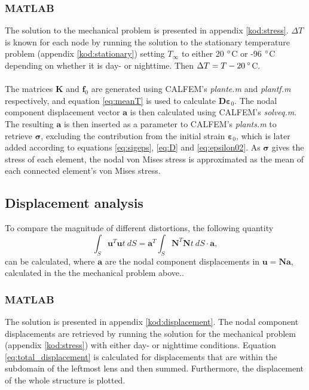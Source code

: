 \documentclass[a4paper,11pt]{article}
\begin{document}
\subsubsection{MATLAB}
The solution to the mechanical problem is presented in appendix \ref{kod:stress}. $\Delta T$ is known for each node by running the solution to the stationary temperature problem (appendix \ref{kod:stationary}) setting $T_{\infty}$ to either 20 $\degree$C or -96 $\degree$C depending on whether it is day- or nighttime. Then $\Delta T = T - 20 \: \degree$C.\\
\\The matrices $\boldsymbol K$ and $\boldsymbol{f}_0$ are generated using CALFEM's \textit{plante.m} and \textit{plantf.m} respectively, and equation \ref{eq:meanT} is used to calculate $\boldsymbol{D \varepsilon}_0$. The nodal component displacement vector $\boldsymbol{a}$ is then calculated using CALFEM's \textit{solveq.m}. The resulting $\boldsymbol{a}$ is then inserted as a parameter to CALFEM's \textit{plants.m} to retrieve $\boldsymbol{\sigma}$, excluding the contribution from the initial strain $\boldsymbol{\varepsilon}_0$, which is later added according to equations \ref{eq:sigeps}, \ref{eq:D} and \ref{eq:epsilon02}. As $\boldsymbol \sigma$ gives the stress of each element, the nodal von Mises stress is approximated as the mean of each connected element's von Mises stress.\\

\subsection{Displacement analysis}
To compare the magnitude of different distortions, the following quantity
\begin{equation}
    \int_S \boldsymbol u^T \boldsymbol u t \: dS = \boldsymbol a^T \int_S \boldsymbol N^T\boldsymbol N t \: dS \cdot \boldsymbol a,
    \label{eq:total_displacement}
\end{equation}
can be calculated, where $\boldsymbol{a}$ are the nodal component displacements in $\boldsymbol u = \boldsymbol{Na}$, calculated in the the mechanical problem above..

\subsubsection{MATLAB}
The solution is presented in appendix \ref{kod:displacement}. The nodal component displacements are retrieved by running the solution for the mechanical problem (appendix \ref{kod:stress}) with either day- or nighttime conditions. Equation \ref{eq:total_displacement} is calculated for displacements that are within the subdomain of the leftmost lens and then summed. Furthermore, the displacement of the whole structure is plotted.
\end{document}

